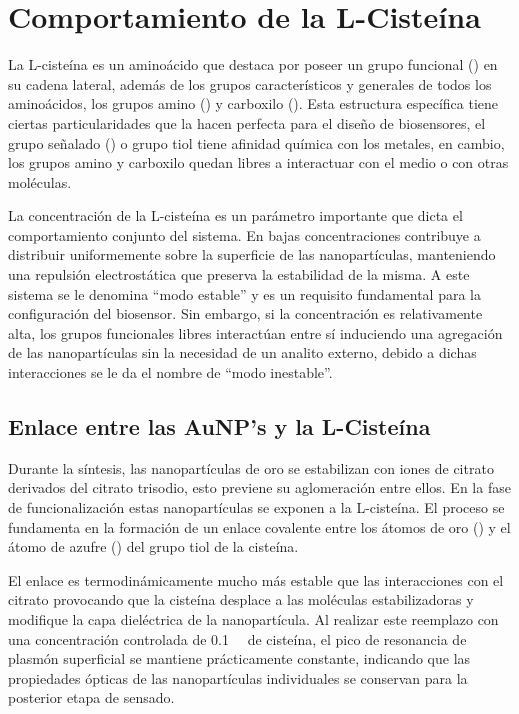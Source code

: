 \section{Comportamiento de la L-Cisteína}

La L-cisteína es un aminoácido que destaca por poseer un grupo funcional
() en su cadena lateral, además de los grupos característicos y
generales de todos los aminoácidos, los grupos amino () y carboxilo
(). Esta estructura específica tiene ciertas particularidades que la
hacen perfecta para el diseño de biosensores, el  grupo señalado () o
grupo tiol tiene afinidad química con los metales, en cambio, los grupos
amino y carboxilo quedan libres a interactuar con el medio o con otras
moléculas.

La concentración de la L-cisteína es un parámetro importante que dicta el
comportamiento conjunto del sistema. En bajas concentraciones contribuye a
distribuir uniformemente sobre la superficie de las nanopartículas,
manteniendo  una repulsión electrostática que preserva la estabilidad de la
misma. A este sistema se le denomina ``modo estable'' y es un requisito
fundamental para la configuración del biosensor. Sin embargo, si la
concentración es relativamente alta, los grupos funcionales libres interactúan
entre sí induciendo una agregación  de las nanopartículas sin la necesidad de
un analito externo, debido a dichas interacciones se le da el nombre de
``modo inestable''.

\subsection{Enlace entre las AuNP's y la L-Cisteína}

Durante la síntesis, las nanopartículas de oro se estabilizan con iones de
citrato derivados del citrato trisodio, esto previene su aglomeración entre
ellos. En la fase de funcionalización estas nanopartículas se exponen a la
L-cisteína. El proceso se fundamenta en la formación de un enlace covalente
entre los átomos de oro () y el átomo de azufre () del grupo tiol
de la cisteína.

El enlace  es termodinámicamente mucho más estable que las interacciones
con el citrato provocando que la cisteína desplace a las moléculas
estabilizadoras y modifique la capa dieléctrica de la nanopartícula.
Al realizar este reemplazo con una concentración controlada de
\qty{0.1}{\milli\molar} de cisteína, el pico de resonancia de plasmón
superficial se mantiene prácticamente constante, indicando que las propiedades
ópticas de las nanopartículas individuales se conservan para la posterior etapa
de sensado.

